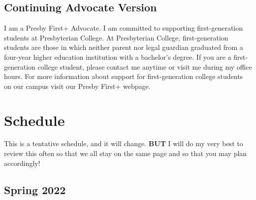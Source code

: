\documentclass[
]{book}
\theoremstyle{definition}
\theoremstyle{definition}
\theoremstyle{definition}
\theoremstyle{definition}
\theoremstyle{remark}
\begin{document}
\hypertarget{continuing-advocate-version}{%
\section{Continuing Advocate Version}\label{continuing-advocate-version}}

I am a Presby First+ Advocate. I am committed to supporting first-generation students at Presbyterian College. At Presbyterian College, first-generation students are those in which neither parent nor legal guardian graduated from a four-year higher education institution with a bachelor's degree. If you are a first-generation college student, please contact me anytime or visit me during my office hours. For more information about support for first-generation college students on our campus visit our Presby First+ webpage.

\hypertarget{schedule}{%
\chapter{Schedule}\label{schedule}}

This is a tentative schedule, and it will change. \textbf{BUT} I will do my very best to review this often so that we all stay on the same page and so that you may plan accordingly!

\hypertarget{spring-2022}{%
\section*{Spring 2022}\label{spring-2022}}
\end{document}
